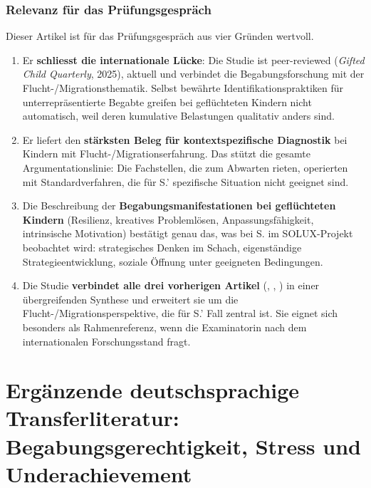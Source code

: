 \documentclass[ngerman, a4paper]{article}
\begin{document}
\subsubsection*{Relevanz für das Prüfungsgespräch}

Dieser Artikel ist für das Prüfungsgespräch aus vier Gründen wertvoll.

\begin{enumerate}
  \item Er \textbf{schliesst die internationale Lücke}: Die Studie ist
        peer-reviewed (\textit{Gifted Child Quarterly}, 2025), aktuell und
        verbindet die Begabungsforschung mit der Flucht-/Migrationsthematik.
        Selbst bewährte Identifikationspraktiken für unterrepräsentierte
        Begabte greifen bei geflüchteten Kindern nicht automatisch, weil
        deren kumulative Belastungen qualitativ anders sind.
  \item Er liefert den \textbf{stärksten Beleg für kontextspezifische
          Diagnostik} bei Kindern mit Flucht-/Migrationserfahrung. Das stützt
        die gesamte Argumentationslinie: Die Fachstellen, die zum Abwarten
        rieten, operierten mit Standardverfahren, die für S.' spezifische
        Situation nicht geeignet sind.
  \item Die Beschreibung der \textbf{Begabungsmanifestationen bei
          geflüchteten Kindern} (Resilienz, kreatives Problemlösen,
        Anpassungsfähigkeit, intrinsische Motivation) bestätigt genau das,
        was bei S. im SOLUX-Projekt beobachtet wird: strategisches Denken im
        Schach, eigenständige Strategieentwicklung, soziale Öffnung unter
        geeigneten Bedingungen.
  \item Die Studie \textbf{verbindet alle drei vorherigen Artikel}
        (\textcite{mun2020identifying}, \textcite{gubbins2020promising},
        \textcite{alhroub2021utility}) in einer übergreifenden Synthese und
        erweitert sie um die Flucht-/Migrationsperspektive, die für S.' Fall
        zentral ist. Sie eignet sich besonders als Rahmenreferenz, wenn die
        Examinatorin nach dem internationalen Forschungsstand fragt.
\end{enumerate}


\section*{Ergänzende deutschsprachige Transferliteratur: Begabungsgerechtigkeit,
  Stress und Underachievement}
\label{sec:karg}
\end{document}
